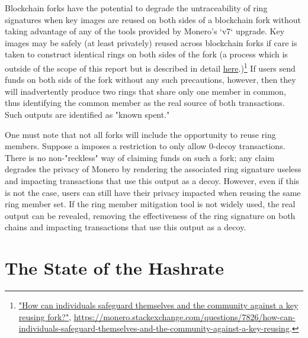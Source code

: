 \documentclass[notitlepage]{report}
\begin{document}
Blockchain forks have the potential to degrade the untraceability of ring signatures when key images are reused on both sides of a blockchain fork without taking advantage of any of the tools provided by Monero's `v7` upgrade.  Key images may be safely (at least privately) reused across blockchain forks if care is taken to construct identical rings on both sides of the fork (a process which is outside of the scope of this report but is described in detail \href{https://monero.stackexchange.com/questions/7826/how-can-individuals-safeguard-themselves-and-the-community-against-a-key-reusing}{here}.)\footnote{\href{https://monero.stackexchange.com/questions/7826/how-can-individuals-safeguard-themselves-and-the-community-against-a-key-reusing}{"How can individuals safeguard themselves and the community against a key reusing fork?"}, \url{https://monero.stackexchange.com/questions/7826/how-can-individuals-safeguard-themselves-and-the-community-against-a-key-reusing}.}  If users send funds on both sids of the fork without any such precautions, however, then they will inadvertently produce two rings that share only one member in common, thus identifying the common member as the real source of both transactions.  Such outputs are identified as "known spent."

One must note that not all forks will include the opportunity to reuse ring members. Suppose a imposes a restriction to only allow 0-decoy transactions. There is no non-"reckless" way of claiming funds on such a fork; any claim degrades the privacy of Monero by rendering the associated ring signature useless and impacting transactions that use this output as a decoy. However, even if this is not the case, users can still have their privacy impacted when reusing the same ring member set. If the ring member mitigation tool is not widely used, the real output can be revealed, removing the effectiveness of the ring signature on both chains and impacting transactions that use this output as a decoy.

\section{The State of the Hashrate}
\setcounter{chapter}{2}
\end{document}
